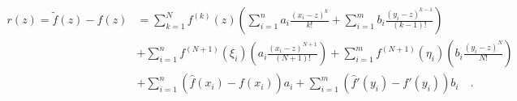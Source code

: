 \begin{equation} \begin{split} \label{resid}
  r(z) = {\tilde f}(z) - f(z) &= \sum_{k=1}^N f^{(k)}(z)
         \left(\sum_{i=1}^n a_i \frac{(x_i - z)^k}{k!} +
               \sum_{i=1}^m b_i \frac{(y_i - z)^{k-1}}{(k-1)!}\right) \\
      &+ \sum_{i=1}^n f^{(N+1)}(\xi_i)
                      \left(a_i \frac{(x_i - z)^{N+1}}{(N+1)!}\right)
       + \sum_{i=1}^m f^{(N+1)}(\eta_i)
                      \left(b_i \frac{(y_i - z)^N}{N!}\right) \\
      &+ \sum_{i=1}^n \left({\hat f}(x_i) - f(x_i)\right) a_i
       + \sum_{i=1}^m \left({\hat f}'(y_i) - f'(y_i)\right) b_i \quad.
\end{split} \end{equation}


